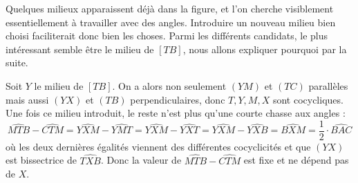 \begin{sol}
\begin{center}
\end{center}

Quelques milieux apparaissent déjà dans la figure, et l'on cherche visiblement essentiellement à travailler avec des angles. Introduire un nouveau milieu bien choisi faciliterait donc bien les choses. Parmi les différents candidats, le plus intéressant semble être le milieu de $[TB]$, nous allons expliquer pourquoi par la suite.

Soit $Y$ le milieu de $[TB]$. On a alors non seulement $(YM)$ et $(TC)$ parallèles mais aussi $(YX)$ et $(TB)$ perpendiculaires, donc $T,Y,M,X$ sont cocycliques. Une fois ce milieu introduit, le reste n'est plus qu'une courte chasse aux angles :
$$\widehat{MTB} - \widehat{CTM} = \widehat{YXM} - \widehat{YMT} = \widehat{YXM} - \widehat{YXT} = \widehat{YXM} - \widehat{YXB} = \widehat{BXM} = \frac 12 \cdot \widehat{BAC}$$
où les deux dernières égalités viennent des différentes cocyclicités et que $(YX)$ est bissectrice de $\widehat{TXB}$.
Donc la valeur de $\widehat{MTB} - \widehat{CTM}$ est fixe et ne dépend pas de $X$.
\end{sol}


